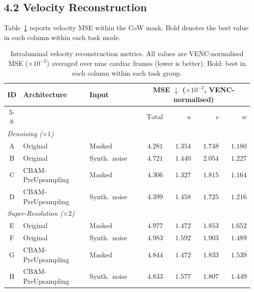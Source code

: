 \documentclass[11pt]{article}
\begin{document}
\subsection*{4.2 Velocity Reconstruction}
\label{sec:velocity}
Table~\ref{tab:velocity} reports velocity MSE within the CoW mask.  Bold denotes the best value
in each column within each task mode.

\begin{table}[!htbp]
  \centering
  \caption{Intraluminal velocity reconstruction metrics.  All values are VENC-normalised MSE
  ($\times 10^{-2}$) averaged over nine cardiac frames (lower is better).  Bold: best in each
  column within each task group.}
  \label{tab:velocity}
  \setlength{\tabcolsep}{5pt}
  \small
  \begin{tabular}{cll l rrrr}
    \toprule
    \multirow{2}{*}{ID} & \multirow{2}{*}{Architecture} & \multirow{2}{*}{Input} &
      & \multicolumn{4}{c}{MSE $\downarrow$ ($\times 10^{-2}$, VENC-normalised)} \\
    \cmidrule(lr){5-8}
    & & & & $\text{Total}$ & $u$ & $v$ & $w$ \\
    \midrule
    \multicolumn{8}{l}{\textit{Denoising ($\times 1$)}} \\
    \midrule
    A & Original           & Masked        & & $\mathbf{4.281}$ & $1.354$ & $1.748$ & $1.180$ \\
    B & Original           & Synth.\ noise & & $4.721$ & $1.440$ & $2.054$ & $1.227$ \\
    C & CBAM-PreUpsampling & Masked        & & $4.306$ & $\mathbf{1.327}$ & $1.815$ & $\mathbf{1.164}$ \\
    D & CBAM-PreUpsampling & Synth.\ noise & & $4.399$ & $1.458$ & $\mathbf{1.725}$ & $1.216$ \\
    \midrule
    \multicolumn{8}{l}{\textit{Super-Resolution ($\times 2$)}} \\
    \midrule
    E & Original           & Masked        & & $4.977$ & $\mathbf{1.472}$ & $1.853$ & $1.652$ \\
    F & Original           & Synth.\ noise & & $4.983$ & $1.592$ & $1.903$ & $1.489$ \\
    G & CBAM-PreUpsampling & Masked        & & $4.844$ & $\mathbf{1.472}$ & $1.833$ & $1.539$ \\
    H & CBAM-PreUpsampling & Synth.\ noise & & $\mathbf{4.833}$ & $1.577$ & $\mathbf{1.807}$ & $\mathbf{1.449}$ \\

\end{tabular}
\end{table}
\end{document}

